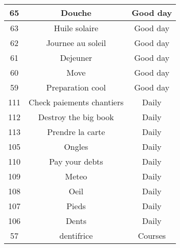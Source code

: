 \begin{longtable}{|c|c|c|}
\hline
65 & Douche & Good day\\
\hline
63 & Huile solaire & Good day\\
\hline
62 & Journee au soleil & Good day\\
\hline
61 & Dejeuner & Good day\\
\hline
60 & Move & Good day\\
\hline
59 & Preparation cool & Good day\\
\hline
111 & Check paiements chantiers & Daily\\
\hline
112 & Destroy the big book & Daily\\
\hline
113 & Prendre la carte & Daily\\
\hline
105 & Ongles & Daily\\
\hline
110 & Pay your debts & Daily\\
\hline
109 & Meteo & Daily\\
\hline
108 & Oeil & Daily\\
\hline
107 & Pieds & Daily\\
\hline
106 & Dents & Daily\\
\hline
57 & dentifrice & Courses\\
\hline
\end{longtable}
